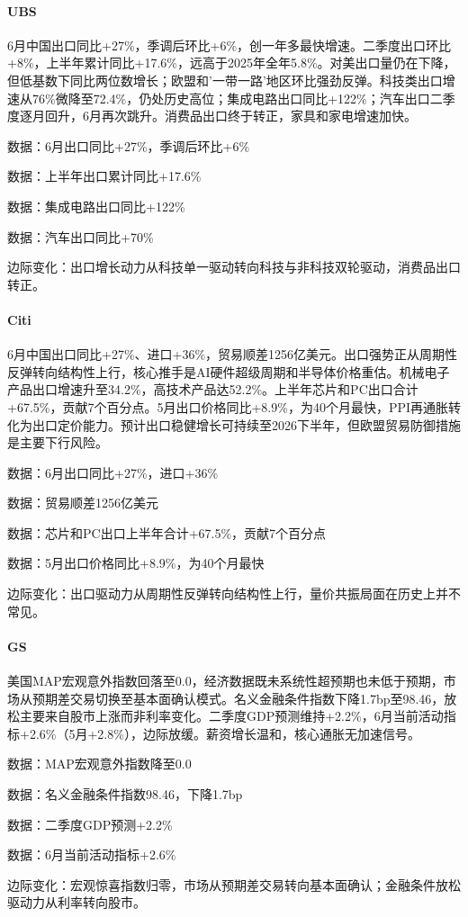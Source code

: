 \documentclass[11pt]{ctexart}
\begin{document}
\paragraph{UBS} 6月中国出口同比+27\%，季调后环比+6\%，创一年多最快增速。二季度出口环比+8\%，上半年累计同比+17.6\%，远高于2025年全年5.8\%。对美出口量仍在下降，但低基数下同比两位数增长；欧盟和'一带一路'地区环比强劲反弹。科技类出口增速从76\%微降至72.4\%，仍处历史高位；集成电路出口同比+122\%；汽车出口二季度逐月回升，6月再次跳升。消费品出口终于转正，家具和家电增速加快。
{\small\color{refgray}数据：6月出口同比+27\%，季调后环比+6\%\par}
{\small\color{refgray}数据：上半年出口累计同比+17.6\%\par}
{\small\color{refgray}数据：集成电路出口同比+122\%\par}
{\small\color{refgray}数据：汽车出口同比+70\%\par}
{\small\color{refgray}边际变化：出口增长动力从科技单一驱动转向科技与非科技双轮驱动，消费品出口转正。\par}
\paragraph{Citi} 6月中国出口同比+27\%、进口+36\%，贸易顺差1256亿美元。出口强势正从周期性反弹转向结构性上行，核心推手是AI硬件超级周期和半导体价格重估。机械电子产品出口增速升至34.2\%，高技术产品达52.2\%。上半年芯片和PC出口合计+67.5\%，贡献7个百分点。5月出口价格同比+8.9\%，为40个月最快，PPI再通胀转化为出口定价能力。预计出口稳健增长可持续至2026下半年，但欧盟贸易防御措施是主要下行风险。
{\small\color{refgray}数据：6月出口同比+27\%，进口+36\%\par}
{\small\color{refgray}数据：贸易顺差1256亿美元\par}
{\small\color{refgray}数据：芯片和PC出口上半年合计+67.5\%，贡献7个百分点\par}
{\small\color{refgray}数据：5月出口价格同比+8.9\%，为40个月最快\par}
{\small\color{refgray}边际变化：出口驱动力从周期性反弹转向结构性上行，量价共振局面在历史上并不常见。\par}
\paragraph{GS} 美国MAP宏观意外指数回落至0.0，经济数据既未系统性超预期也未低于预期，市场从预期差交易切换至基本面确认模式。名义金融条件指数下降1.7bp至98.46，放松主要来自股市上涨而非利率变化。二季度GDP预测维持+2.2\%，6月当前活动指标+2.6\%（5月+2.8\%），边际放缓。薪资增长温和，核心通胀无加速信号。
{\small\color{refgray}数据：MAP宏观意外指数降至0.0\par}
{\small\color{refgray}数据：名义金融条件指数98.46，下降1.7bp\par}
{\small\color{refgray}数据：二季度GDP预测+2.2\%\par}
{\small\color{refgray}数据：6月当前活动指标+2.6\%\par}
{\small\color{refgray}边际变化：宏观惊喜指数归零，市场从预期差交易转向基本面确认；金融条件放松驱动力从利率转向股市。\par}
\end{document}
